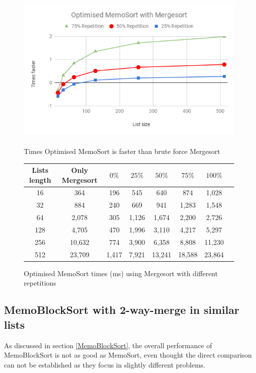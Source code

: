 \documentclass[a4paper,12pt]{article}
\begin{document}
\begin{figure}[H]
    \centering
    \includegraphics[height=8cm,keepaspectratio]{./images/OptMemoSortMerge.png}
    \caption{Times Optimised MemoSort is faster than brute force Mergesort}
    \label{fig:OptMemoSortMergeGraph}
\end{figure}


\begin{figure}[H]
\centering
\begin{tabular}{|c|c|c|c|c|c|c|c|}  \toprule
	{Lists length} & {Only Mergesort} & {$0\%$} & {$25\%$} & {$50\%$} & {$75\%$} & {$100\%$} \\ \midrule
	16 &364&196&545 & 640 &874&1,028\\ 
	32 &884&240&669 & 941&1,283&1,548\\ 
	64 &2,078&305 &1,126&1,674&2,200&2,726\\ 
	128 &4,705&470&1,996&3,110&4,217&5,297\\ 
	256 &10,632&774&3,900&6,358&8,808&11,230\\ 
	512 &23,709& 1,417&7,921&13,241&18,588&23,864\\ \bottomrule
\end{tabular}
\caption{Optimised MemoSort times (ms) using Mergesort with different repetitions}
\label{ref:OptMemoSortMergeTable}
\end{figure}

\subsection{MemoBlockSort with 2-way-merge in similar lists}\label{MemoBlock2Res}

As discussed in section \ref{MemoBlockSort}, the overall performance of MemoBlockSort is not as good as MemoSort, even thought the direct comparison can not be established as they focus in slightly different problems. \\
\end{document}
